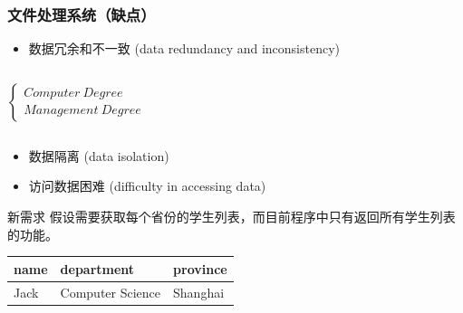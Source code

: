 \documentclass[aspectratio=169, 14pt]{beamer}
\begin{document}
\begin{frame}
	\frametitle{文件处理系统（缺点）}

	\begin{itemize}
		\item \alert{数据冗余和不一致} (data redundancy and inconsistency)
	\end{itemize}

	\begin{columns}

		 \(
		\begin{cases}
			Computer\ Degree \\
			Management\ Degree
		\end{cases}
		\)
	\end{columns}
	\pause
	\begin{itemize}
		\item \alert{数据隔离
		      } (data isolation)
	\end{itemize}


\end{frame}

\begin{frame}
	\begin{itemize}
		\item \alert{访问数据困难
		      } (difficulty in accessing data)
	\end{itemize}
	\begin{block}{新需求}
		假设需要获取每个省份的学生列表，而目前程序中只有返回所有学生列表的功能。
	\end{block}

	\begin{table}
		\begin{tabular}{lll}
			\toprule
			name & department       & province \\
			\midrule
			Jack & Computer Science & Shanghai \\
			\bottomrule
		\end{tabular}
	\end{table}

\end{frame}
\end{document}
